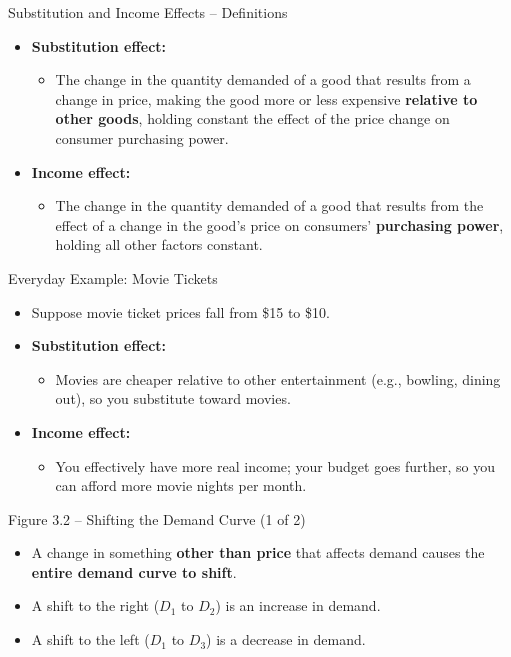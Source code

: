 \documentclass[aspectratio=169]{beamer}
\begin{document}
\begin{frame}{Substitution and Income Effects -- Definitions}
\transfade
\begin{itemize}
  \item \textbf{Substitution effect:}
  \begin{itemize}
    \item The change in the quantity demanded of a good that results from a change in price, making the good more or less expensive \textbf{relative to other goods}, holding constant the effect of the price change on consumer purchasing power.
  \end{itemize}
  \item \textbf{Income effect:}
  \begin{itemize}
    \item The change in the quantity demanded of a good that results from the effect of a change in the good's price on consumers' \textbf{purchasing power}, holding all other factors constant.
  \end{itemize}
\end{itemize}
\end{frame}

\begin{frame}{Everyday Example: Movie Tickets}
\transfade
\small
\begin{itemize}
  \item Suppose movie ticket prices fall from \$15 to \$10.
  \item \textbf{Substitution effect:}
  \begin{itemize}
    \item Movies are cheaper relative to other entertainment (e.g., bowling, dining out), so you substitute toward movies.
  \end{itemize}
  \item \textbf{Income effect:}
  \begin{itemize}
    \item You effectively have more real income; your budget goes further, so you can afford more movie nights per month.
  \end{itemize}
\end{itemize}
\end{frame}


\begin{frame}{Figure 3.2 -- Shifting the Demand Curve (1 of 2)}
\transfade
\begin{itemize}
  \item A change in something \textbf{other than price} that affects demand causes the \textbf{entire demand curve to shift}.
  \item A shift to the right (\(D_1\) to \(D_2\)) is an \alert{increase in demand}.
  \item A shift to the left (\(D_1\) to \(D_3\)) is a \alert{decrease in demand}.
\end{itemize}
\end{frame}
\end{document}
